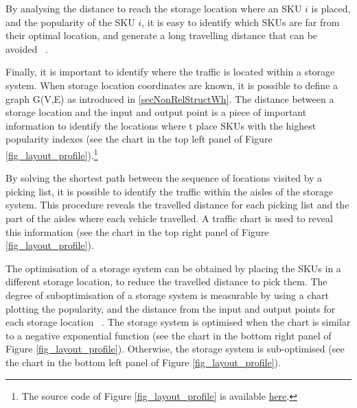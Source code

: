 By analysing the distance to reach the storage location where an SKU $i$ is placed, and the popularity of the SKU $i$, it is easy to identify which SKUs are far from their optimal location, and generate a long travelling distance that can be avoided ~\cite{Manzini2018}.\par

Finally, it is important to identify where the traffic is located within a storage system.  When storage location coordinates are known, it is possible to define a graph G(V,E) as introduced in \ref{secNonRelStructWh}. The distance between a storage location and the input and output point is a piece of important information to identify the locations where t place SKUs with the highest popularity indexes (see the chart in the top left panel of Figure \ref{fig_layout_profile}).\footnote{The source code of Figure \ref{fig_layout_profile} is available \href{https://github.com/aletuf93/logproj/blob/master/examples/WH_04\%20Warehouse\%20layout\%20assessment.ipynb}{here}.} \par

By solving the shortest path between the sequence of locations visited by a picking list, it is possible to identify the traffic within the aisles of the storage system. This procedure reveals the travelled distance for each picking list and the part of the aisles where each vehicle travelled. A traffic chart is used to reveal this information (see the chart in the top right panel of Figure \ref{fig_layout_profile}). \par

The optimisation of a storage system can be obtained by placing the SKUs in a different storage location, to reduce the travelled distance to pick them. The degree of suboptimisation of a storage system is measurable by using a chart plotting the popularity, and the distance from the input and output points for each storage location ~\cite{Manzini2018}. The storage system is optimised when the chart is similar to a negative exponential function (see the chart in the bottom right panel of Figure \ref{fig_layout_profile}). Otherwise, the storage system is sub-optimised (see the chart in the bottom left panel of Figure \ref{fig_layout_profile}). \par

